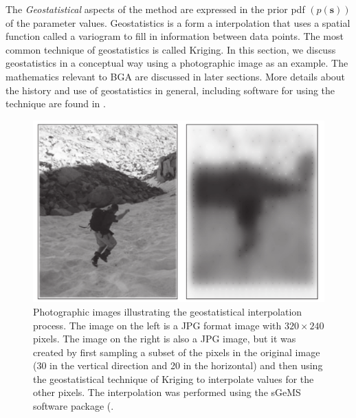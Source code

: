 \documentclass[11pt,oneside,onecolumn]{usgsreport}
\begin{document}
\begin{multicols}{2}
The \emph{Geostatistical }aspects of the method are expressed in the
prior pdf $\left(p\left(\mathbf{s}\right)\right)$ of the parameter
values. Geostatistics is a form a interpolation that uses a spatial
function called a variogram to fill in information between data points.
The most common technique of geostatistics is called Kriging. In this
section, we discuss geostatistics in a conceptual way using a photographic
image as an example. The mathematics relevant to BGA are discussed
in later sections. More details about the history and use of geostatistics
in general, including software for using the technique are found in
\citet{Isaaks1989,DeutschJourneal1992,Kitanidis1997,sgems}.

\begin{figure}[H]
\begin{center}\includegraphics[scale=0.6]{figures/Kriging_image}\end{center}

\caption{\label{fig:mike_photo}Photographic images illustrating the geostatistical
interpolation process. The image on the left is a JPG format image
with $320\times240$ pixels. The image on the right is also a JPG
image, but it was created by first sampling a subset of the pixels
in the original image (30 in the vertical direction and 20 in the
horizontal) and then using the geostatistical technique of Kriging
to interpolate values for the other pixels. The interpolation was
performed using the sGeMS software package (\citet{sgems}.}
\end{figure}



\end{multicols}
\end{document}
